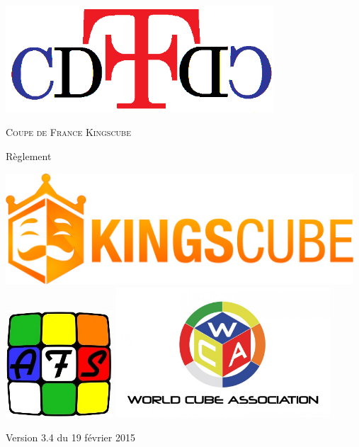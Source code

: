 \documentclass[10pt,a4paper]{article}
\newcommand{\cdf}{Coupe de France Kingscube}
\newcommand{\3}{$3\times3$}
\newcommand{\4}{$4\times4$}
\newcommand{\2}{$2\times2$}
\begin{document}
\begin{titlepage}
\begin{center}

\vfill

\includegraphics[width=10cm]{logo.png}

\vskip 3cm

\Huge{\textsc{\cdf}}

\vskip 1cm

\Huge{Règlement}

\vskip 3cm

\includegraphics[width=13cm]{KingsCube-logo-lightBG.jpg}
\includegraphics[width=4cm]{logoAFS.jpg} \hskip 1cm
\includegraphics[width=8cm]{WCAlogo_XL.jpg}

\vfill

\large{Version 3.4 du 19 février 2015}


\end{center}
\end{titlepage}
\end{document}
